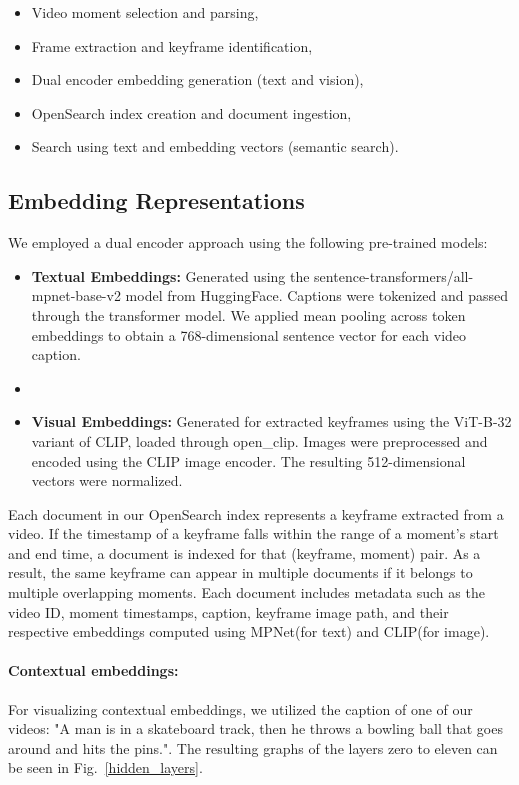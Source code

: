 \documentclass[runningheads]{llncs}
\begin{document}
\begin{itemize}
    \item Video moment selection and parsing,
    \item Frame extraction and keyframe identification,
    \item Dual encoder embedding generation (text and vision),
    \item OpenSearch index creation and document ingestion,
    \item Search using text and embedding vectors (semantic search).
\end{itemize}

\subsection{Embedding Representations}
We employed a dual encoder approach using the following pre-trained models:

\begin{itemize}
    \item \textbf{Textual Embeddings:} Generated using the sentence-transformers/all-mpnet-base-v2 model from HuggingFace. Captions were tokenized and passed through the transformer model. We applied mean pooling across token embeddings to obtain a 768-dimensional sentence vector for each video caption.
    \item 
    \item \textbf{Visual Embeddings:} Generated for extracted keyframes using the ViT-B-32 variant of CLIP, loaded through open\_clip. Images were preprocessed and encoded using the CLIP image encoder. The resulting 512-dimensional vectors were normalized.
\end{itemize}

Each document in our OpenSearch index represents a keyframe extracted from a video. If the timestamp of a keyframe falls within the range of a moment's start and end time, a document is indexed for that (keyframe, moment) pair. As a result, the same keyframe can appear in multiple documents if it belongs to multiple overlapping moments. Each document includes metadata such as the video ID, moment timestamps, caption, keyframe image path, and their respective embeddings computed using MPNet(for text) and CLIP(for image).

\paragraph{Contextual embeddings:}For visualizing contextual embeddings, we utilized the caption of one of our videos: "A man is in a skateboard track, then he throws a bowling ball that goes around and hits the pins.". The resulting graphs of the layers zero to eleven can be seen in Fig.~\ref{hidden_layers}.
\end{document}

